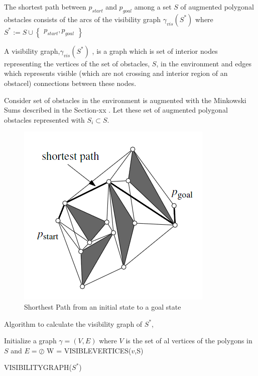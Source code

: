 \begin{displayquote}
The shortest path between $p_{start}$ and $p_{goal}$ among a set $S$ of augmented polygonal obstacles consists of the arcs of the visibility graph $\gamma_{vis}(S^*)$ where $S^* := S \cup \begin{Bmatrix}
p_{start}, p_{goal}
\end{Bmatrix}$
\end{displayquote}

A visibility graph,$\gamma_{vis}(S^*)$ , is a graph which is set of interior nodes representing the vertices of the set of obstacles, $S$, in the environment and edges which represents visible (which are not crossing and interior region of an obstacel) connections between these nodes. 

Consider set of obstacles in the environment is augmented with the Minkowski Sums described in the Section-xx . Let these set of augmented polygonal obstacles represented with $S_i \subset S$. 

\begin{figure}[H]
\caption{Shorthest Path from an initial state to a goal state}
\centering
\includegraphics[scale = 0.4]{shortest}
\end{figure} 

Algorithm to calculate the visibility graph of $S^*$,
	
\begin{algorithm}[H]
Initialize a graph $\gamma = (V,E)$ where $V$ is the set of al vertices of the polygons in $S$ and $E = \oslash$ 
{		
W = VISIBLEVERTICES($v$,S)\;}
\caption{VISIBILITYGRAPH($S^*$)}
\end{algorithm}

